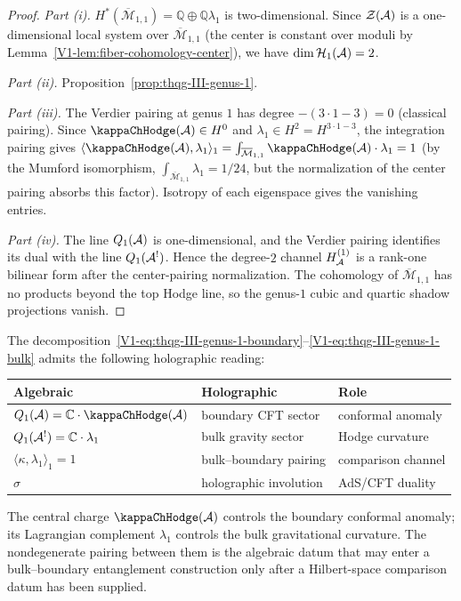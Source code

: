 \begin{proof}
\emph{Part (i).}
$H^*(\overline{\mathcal{M}}_{1,1}) = \mathbb{Q} \oplus
\mathbb{Q}\lambda_1$ is two-dimensional.
Since $\mathcal{Z}(\mathcal{A})$ is a one-dimensional local system
over $\overline{\mathcal{M}}_{1,1}$ (the center is constant
over moduli by
Lemma~\ref{V1-lem:fiber-cohomology-center}), we have
$\dim \mathcal{H}_1(\mathcal{A}) = 2$.

\emph{Part (ii).}
Proposition~\ref{prop:thqg-III-genus-1}.

\emph{Part (iii).}
The Verdier pairing at genus $1$ has degree
$-(3 \cdot 1 - 3) = 0$ (classical pairing).
Since $\kappaChHodge(\cA) \in H^0$ and
$\lambda_1 \in H^2 = H^{3 \cdot 1 - 3}$,
the integration pairing gives
$\langle \kappaChHodge(\cA), \lambda_1 \rangle_1
= \int_{\overline{\mathcal{M}}_{1,1}} \kappaChHodge(\cA) \cdot
\lambda_1 = 1$ (by the Mumford isomorphism,
$\int_{\overline{\mathcal{M}}_{1,1}} \lambda_1 = 1/24$,
but the normalization of the center pairing absorbs this
factor). Isotropy of each eigenspace gives the vanishing
entries.

\emph{Part (iv).}
The line $Q_1(\mathcal{A})$ is one-dimensional, and the Verdier pairing
identifies its dual with the line $Q_1(\mathcal{A}^!)$.  Hence the
degree-$2$ channel $H_{\mathcal{A}}^{(1)}$ is a rank-one bilinear form after the
center-pairing normalization.  The cohomology of
$\overline{\mathcal{M}}_{1,1}$ has no products beyond the top Hodge
line, so the genus-$1$ cubic and quartic shadow projections vanish.
\end{proof}

\begin{remark}
The decomposition~\eqref{V1-eq:thqg-III-genus-1-boundary}--\eqref{V1-eq:thqg-III-genus-1-bulk}
admits the following holographic reading:
\begin{center}
\renewcommand{\arraystretch}{1.2}
\begin{tabular}{l@{\quad}l@{\quad}l}
\textbf{Algebraic} & \textbf{Holographic} & \textbf{Role} \\
\midrule
$Q_1(\cA) = \mathbb{C} \cdot \kappaChHodge(\cA)$ &
 boundary CFT sector &
 conformal anomaly \\
$Q_1(\mathcal{A}^!) = \mathbb{C} \cdot \lambda_1$ &
 bulk gravity sector &
 Hodge curvature \\
$\langle \kappa, \lambda_1 \rangle_1 = 1$ &
 bulk--boundary pairing &
 comparison channel \\
$\sigma$ &
 holographic involution &
 AdS/CFT duality \\
\end{tabular}
\end{center}
The central charge $\kappaChHodge(\cA)$ controls the
boundary conformal anomaly; its Lagrangian complement
$\lambda_1$ controls the bulk gravitational curvature.
The nondegenerate pairing between them is the algebraic datum that may
enter a bulk--boundary entanglement construction only after a
Hilbert-space comparison datum has been supplied.
\end{remark}

